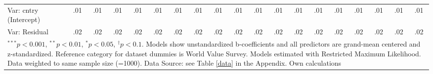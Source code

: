 \begin{landscape}
\begin{table}[!htb]
{\begin{tabular}{l c c c c c c c c c c c c c c c c c c }
			Var: cntry (Intercept)                      & .01                        & .01                        & .01                   & .01                        & .01                        & .01                   & .01                       & .01                        & .01                   & .01                        & .01                       & .01                        & .01                       & .01                        & .01                        & .01                        & .01                        & .01                   \\
			Var: Residual                               & .02                        & .02                        & .02                   & .02                        & .02                        & .02                   & .02                       & .02                        & .02                   & .02                        & .02                       & .02                        & .02                       & .02                        & .02                        & .02                        & .02                        & .02                   \\
			\bottomrule
\multicolumn{19}{l}{\scriptsize{$^{***}p<0.001$, $^{**}p<0.01$, $^*p<0.05$, $^{\dagger}p<0.1$. Models show unstandardized b-coefficients and all predictors are grand-mean centered and z-standardized. Reference category for dataset dummies is World Value Survey. Models estimated with Restricted Maximum Likelihood. Data weighted to same sample size (=1000). Data Source: see Table \ref{data} in the Appendix. Own calculations}}
\end{tabular}
}
\end{table}
\end{landscape}







